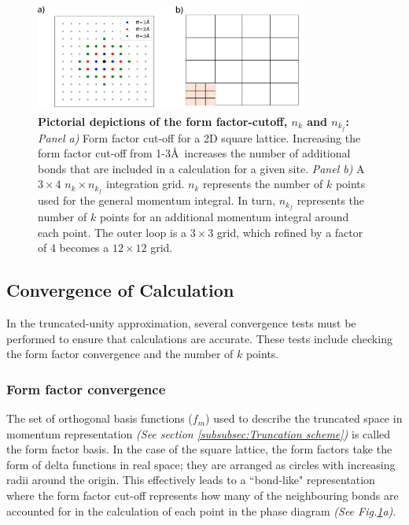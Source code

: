 \documentclass[11pt]{article}
\begin{document}
\begin{figure}[htbp]  %
    \centering
    \includegraphics[width=0.8\textwidth]{nknkfff.png}  %
    \caption{\textbf{Pictorial depictions of the form factor-cutoff, $n_k$ and $n_{k_f}$:} \textit{Panel a)}
    Form factor cut-off for a 2D square lattice. 
    Increasing the form factor cut-off from 1-3\AA\  increases the number of additional bonds
    that are included in a calculation for a given site. 
    \textit{Panel b)} A $3 \times 4$ $n_k \times n_{k_f}$ integration grid. $n_k$ represents the number of $k$ points used for the general momentum integral. In turn, 
    $n_{k_f}$ represents the number of $k$ points for an additional momentum integral around each point. The outer loop is a $3 \times 3$ grid, which refined 
    by a factor of 4 becomes a $12 \times 12$ grid.}
    \label{fig:nknkf}
\end{figure}
 

\subsection{Convergence of Calculation}
\label{subsec:convergence}
In the truncated-unity approximation, several convergence tests must be performed to ensure that calculations are accurate.
These tests include checking the form factor convergence and the number of $k$ points.

\subsubsection{Form factor convergence}

The set of orthogonal basis functions ($f_m$) used to describe the truncated space 
in momentum representation \textit{(See section \ref{subsubsec:Truncation scheme})} is called the form factor basis\cite{lichtenstein2018functional}. In the case of the square lattice, 
the form factors take the form of delta functions in real space; they are arranged as circles with increasing radii around the origin. This effectively leads to a ``bond-like" representation where the form factor cut-off
represents how many of the neighbouring bonds are accounted for in the calculation of each point in the phase diagram \textit{(See Fig.\ref{fig:nknkf}a)}.\par
\end{document}
